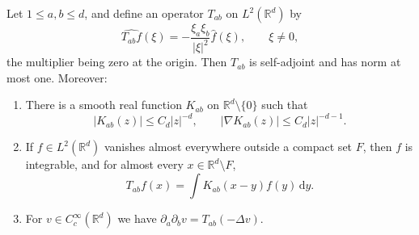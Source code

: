 \begin{lemma}\label{lem:hessian-multiplier-kernel}
Let $1\leq a,b\leq d$, and define an operator $T_{ab}$ on $L^2(\mathbb R^d)$ by
\[
 \widehat{T_{ab}f}(\xi)=-\frac{\xi_a\xi_b}{|\xi|^2}\widehat f(\xi),
 \qquad \xi\neq0,
\]
the multiplier being zero at the origin. Then $T_{ab}$ is self-adjoint and has norm at most one. Moreover:
\begin{enumerate}
\item There is a smooth real function $K_{ab}$ on $\mathbb R^d\setminus\{0\}$ such that
\[
 |K_{ab}(z)|\leq C_d|z|^{-d},\qquad
 |\nabla K_{ab}(z)|\leq C_d|z|^{-d-1}.
\]
\item If $f\in L^2(\mathbb R^d)$ vanishes almost everywhere outside a compact set $F$, then $f$ is integrable, and for almost every $x\in\mathbb R^d\setminus F$,
\[
 T_{ab}f(x)=\int K_{ab}(x-y)f(y)\,\mathrm d y.
\]
\item For $v\in C_c^\infty(\mathbb R^d)$ we have $\partial_a\partial_bv=T_{ab}(-\Delta v)$.
\end{enumerate}
\end{lemma}
